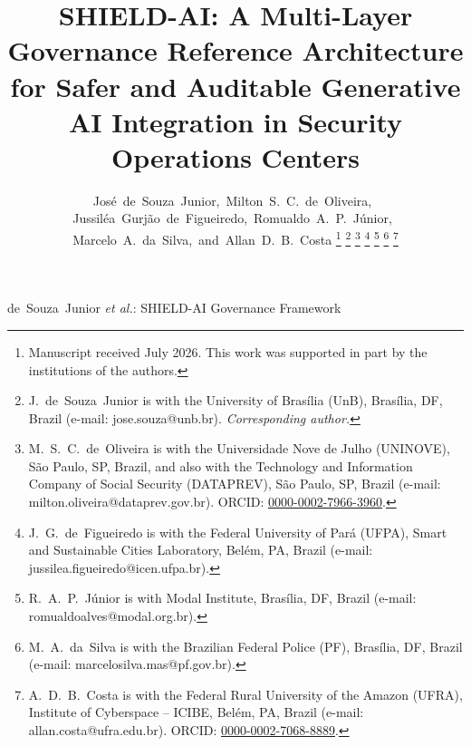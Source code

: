 \documentclass[journal]{IEEEtran}
\begin{document}
\sloppy

\title{SHIELD-AI: A Multi-Layer Governance Reference Architecture for Safer and Auditable Generative AI Integration in Security Operations Centers}

\author{José~de~Souza~Junior,~Milton~S.~C.~de~Oliveira,~%
Jussiléa~Gurjão~de~Figueiredo,~Romualdo~A.~P.~Júnior,~%
Marcelo~A.~da~Silva,~and~\mbox{Allan~D.~B.~Costa}%
\thanks{Manuscript received July 2026. This work was supported in part by the
institutions of the authors.}%
\thanks{J.~de~Souza~Junior is with the University of Brasília (UnB), Brasília, DF, Brazil
(e-mail: jose.souza@unb.br). \emph{Corresponding author.}}%
\thanks{M.~S.~C.~de~Oliveira is with the Universidade Nove de Julho (UNINOVE),
São Paulo, SP, Brazil, and also with the Technology and Information Company
of Social Security (DATAPREV), São Paulo, SP, Brazil
(e-mail: milton.oliveira@dataprev.gov.br).
ORCID: \href{https://orcid.org/0000-0002-7966-3960}{0000-0002-7966-3960}.}%
\thanks{J.~G.~de~Figueiredo is with the Federal University of Pará (UFPA), Smart and
Sustainable Cities Laboratory, Belém, PA, Brazil
(e-mail: jussilea.figueiredo@icen.ufpa.br).}%
\thanks{R.~A.~P.~Júnior is with Modal Institute, Brasília, DF, Brazil
(e-mail: romualdoalves@modal.org.br).}%
\thanks{M.~A.~da~Silva is with the Brazilian Federal Police (PF),
Brasília, DF, Brazil
(e-mail: marcelosilva.mas@pf.gov.br).}%
\thanks{A.~D.~B.~Costa is with the Federal Rural University of the Amazon (UFRA),
Institute of Cyberspace -- ICIBE, Belém, PA, Brazil
(e-mail: allan.costa@ufra.edu.br).
ORCID: \href{https://orcid.org/0000-0002-7068-8889}{0000-0002-7068-8889}.}%
}

%
{de~Souza~Junior \MakeLowercase{\textit{et al.}}: SHIELD-AI Governance Framework}

\maketitle
\end{document}
